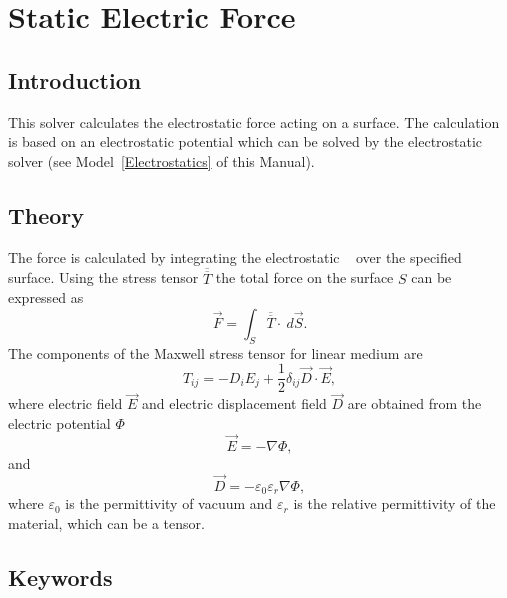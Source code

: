 \chapter{Static Electric Force}
\noindent
{}


\section{Introduction}

This solver calculates the electrostatic force acting on a
surface. The calculation is based on an electrostatic potential which
can be solved by the electrostatic solver (see Model~\ref{Electrostatics}
of this Manual).


\section{Theory}

The force is calculated by integrating the electrostatic ~\cite{vanderlinde93} over the specified surface. Using
the stress tensor $\overline{\overline T}$ the total force on the
surface $S$ can be expressed as
\begin{equation}
\Vec{F} = \int_S \overline{\overline T}\cdot~d\Vec{S}.
\end{equation}
The components of the Maxwell stress tensor for linear medium are
\begin{equation}
T_{ij} = -D_iE_j + \frac{1}{2}\delta_{ij}\Vec{D}\cdot\Vec{E},
\end{equation}
where electric field $\vec{E}$ and electric displacement field
$\vec{D}$ are obtained from the electric potential $\Phi$
\begin{equation}
\vec{E} = -\nabla\Phi,
\end{equation}
and
\begin{equation}
\vec{D} = -\varepsilon_0\varepsilon_r\nabla\Phi,
\end{equation}
where $\varepsilon_0$ is the permittivity of vacuum and
$\varepsilon_r$ is the relative permittivity of the material, which
can be a tensor.


\section{Keywords}

